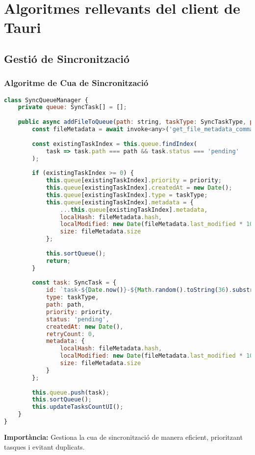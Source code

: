 
\chapter{Algoritmes rellevants del client de Tauri}

\section{Gestió de Sincronització}

\subsection{Algoritme de Cua de Sincronització}
\begin{lstlisting}[language=JavaScript]
class SyncQueueManager {
    private queue: SyncTask[] = [];
    
    public async addFileToQueue(path: string, taskType: SyncTaskType, priority: SyncTaskPriority = SyncTaskPriority.MEDIUM) {
        const fileMetadata = await invoke<any>('get_file_metadata_command', { path });
        
        const existingTaskIndex = this.queue.findIndex(
            task => task.path === path && task.status === 'pending'
        );
        
        if (existingTaskIndex >= 0) {
            this.queue[existingTaskIndex].priority = priority;
            this.queue[existingTaskIndex].createdAt = new Date();
            this.queue[existingTaskIndex].type = taskType;
            this.queue[existingTaskIndex].metadata = {
                ...this.queue[existingTaskIndex].metadata,
                localHash: fileMetadata.hash,
                localModified: new Date(fileMetadata.last_modified * 1000),
                size: fileMetadata.size
            };
            
            this.sortQueue();
            return;
        }
        
        const task: SyncTask = {
            id: `task-${Date.now()}-${Math.random().toString(36).substr(2, 9)}`,
            type: taskType,
            path: path,
            priority: priority,
            status: 'pending',
            createdAt: new Date(),
            retryCount: 0,
            metadata: {
                localHash: fileMetadata.hash,
                localModified: new Date(fileMetadata.last_modified * 1000),
                size: fileMetadata.size
            }
        };
        
        this.queue.push(task);
        this.sortQueue();
        this.updateTasksCountUI();
    }
}
\end{lstlisting}
\textbf{Importància:} Gestiona la cua de sincronització de manera eficient, prioritzant tasques i evitant duplicats.

